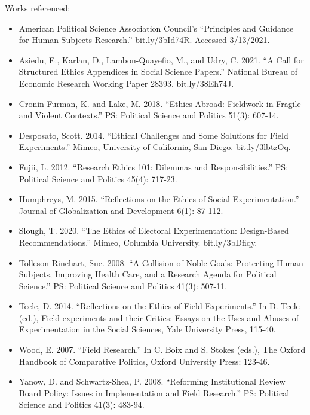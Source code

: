\documentclass[
  11.5pt,
]{article}
\providecommand{\tightlist}{%
  \setlength{\itemsep}{0pt}\setlength{\parskip}{0pt}}
\begin{document}
\noindent Works referenced:

\begin{itemize}
\tightlist
\item
  American Political Science Association Council's ``Principles and
  Guidance for Human Subjects Research.'' bit.ly/3bId74R. Accessed
  3/13/2021.
\item
  Asiedu, E., Karlan, D., Lambon-Quayefio, M., and Udry, C. 2021. ``A
  Call for Structured Ethics Appendices in Social Science Papers.''
  National Bureau of Economic Research Working Paper 28393.
  bit.ly/38Eh74J.
\item
  Cronin-Furman, K. and Lake, M. 2018. ``Ethics Abroad: Fieldwork in
  Fragile and Violent Contexts.'' PS: Political Science and Politics
  51(3): 607-14.
\item
  Desposato, Scott. 2014. ``Ethical Challenges and Some Solutions for
  Field Experiments.'' Mimeo, University of California, San Diego.
  bit.ly/3lbtzOq.
\item
  Fujii, L. 2012. ``Research Ethics 101: Dilemmas and
  Responsibilities.'' PS: Political Science and Politics 45(4): 717-23.
\item
  Humphreys, M. 2015. ``Reflections on the Ethics of Social
  Experimentation.'' Journal of Globalization and Development 6(1):
  87-112.
\item
  Slough, T. 2020. ``The Ethics of Electoral Experimentation:
  Design-Based Recommendations.'' Mimeo, Columbia University.
  bit.ly/3bDfiqy.
\item
  Tolleson-Rinehart, Sue. 2008. ``A Collision of Noble Goals: Protecting
  Human Subjects, Improving Health Care, and a Research Agenda for
  Political Science.'' PS: Political Science and Politics 41(3): 507-11.
\item
  Teele, D. 2014. ``Reflections on the Ethics of Field Experiments.'' In
  D. Teele (ed.), Field experiments and their Critics: Essays on the
  Uses and Abuses of Experimentation in the Social Sciences, Yale
  University Press, 115-40.
\item
  Wood, E. 2007. ``Field Research.'' In C. Boix and S. Stokes (eds.),
  The Oxford Handbook of Comparative Politics, Oxford University Press:
  123-46.
\item
  Yanow, D. and Schwartz-Shea, P. 2008. ``Reforming Institutional Review
  Board Policy: Issues in Implementation and Field Research.'' PS:
  Political Science and Politics 41(3): 483-94.
\end{itemize}
\end{document}
